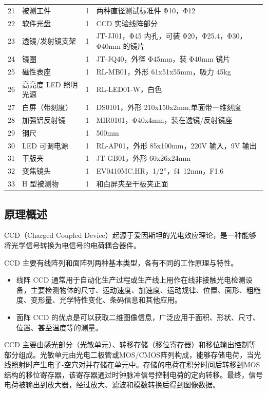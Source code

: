 \documentclass[dvipsnames, svgnames,a4paper,11pt]{article}
\begin{document}
\begin{longtable}{p{}|p{}|p{}|p{}}
	21 & 被测工件 & 1 & 两种直径测试标准件 Φ10，Φ12 \\
	22 & 软件光盘 & 1 & CCD 实验线阵部分 \\
	23 & 透镜/发射镜支架 & 1 & JT-JJ01，Φ45 内孔，可装 Φ20，Φ25.4，Φ30，Φ40mm 的镜片 \\
	24 & 镜圈 & 1 & JT-JQ40，外径 Φ45mm，装 Φ40mm 镜片 \\
	25 & 磁性表座 & 1 & RL-MB01，外形 61x51x55mm，吸力 45kg \\
	26 & 高亮度 LED 照明光源 & 1 & RL-LED01-W，白色 \\
	27 & 白屏（带刻度） & 1 & DS0101，外形 210x150x2mm,单面带一维刻度 \\
	28 & 加强铝反射镜 & 1 & MIR0101，Φ40x4mm，装在透镜/反射镜座 \\
	29 & 钢尺 & 1 & 500mm \\
	30 & LED 可调电源 & 1 & RL-AP01，外形 85x100mm，220V 输入，9V 输出 \\
	31 & 干版夹 & 1 & JT-GB01，外形 60x26x24mm \\
	32 & 变焦镜头 & 1 & EV0410MC.HR，1/2”，f4~12mm，F1.6 \\
	33 & H 型被测物 & 1 & 和白屏夹至干板夹正面 \\
\end{longtable}





\subsection{原理概述}

	CCD（Charged Coupled Device）起源于爱因斯坦的光电效应理论，是一种能够将光学信号转换为电信号的电荷耦合器件。

	CCD 主要有线阵列和面阵列两种基本类型，各有不同的工作原理与特性。
	\begin{itemize}
		\item 线阵 CCD 通常用于自动化生产过程或生产线上用作在线非接触光电检测设备，主要检测物体的尺寸、运动速度、加速度、运动规律、位置、面形、粗糙度、变形量、光学特性变化、条码信息和其他应用。
		\item 面阵 CCD 的优点是可以获取二维图像信息，广泛应用于面积、形状、尺寸、位置、甚至温度等的测量。
	\end{itemize}

	CCD 主要由感光部分（光敏单元）、转移存储（移位寄存器）和移位输出控制等部分组成。光敏单元由光电二极管或MOS/CMOS阵列构成，能够存储电荷，当光线照射时产生电子-空穴对并存储在单元中。存储的电荷在积分时间后转移到MOS结构的移位寄存器，该寄存器通过时钟脉冲信号控制电荷的定向转移。最终，信号电荷被输出到放大器，经过放大、滤波和模数转换后得到图像数据。
\end{document}
